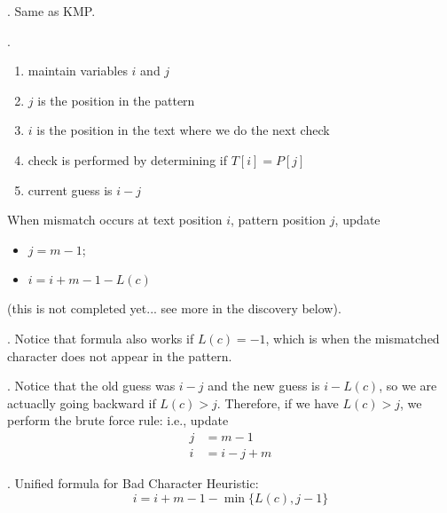 \documentclass{article}
\begin{document}
\begin{comm}[].
    Same as KMP.
\end{comm}

\begin{algo}[].
    \begin{enumerate}
        \item maintain variables $i$ and $j$ 
        \item $j$ is the position in the pattern 
        \item $i$ is the position in the text where we do the next check 
        \item check is performed by determining if $T[i] = P[j]$ 
        \item current guess is $i - j$ 
    \end{enumerate}

    \vspace{0.3cm}
    When mismatch occurs at text position $i$, pattern position $j$, update 
    \begin{itemize}
        \item $j = m - 1$; 
        \item $i = i + m - 1 - L(c)$
    \end{itemize}
    (this is not completed yet... see more in the discovery below).  
    \vspace{-0.3cm}
    \begin{comm}[].
        Notice that formula also works if $L(c) = -1$, which is when the mismatched character does not appear in the pattern. 
    \end{comm}
\end{algo}

\begin{discovery}[].
    Notice that the old guess was $i - j$ and the new guess is $i - L(c)$, so we are actuaclly going backward if $L(c) > j$. Therefore, if we have $L(c) > j$, we perform the brute force rule: i.e., update \begin{align*}
        j & = m - 1 \\ 
        i & = i - j + m 
    \end{align*}
\end{discovery}

\begin{thmm}[].
    Unified formula for Bad Character Heuristic: 
    \[ i = i + m - 1 - \min \{ L(c), j - 1 \} \]
\end{thmm}

\newpage
\end{document}
